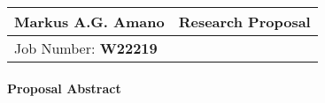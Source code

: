 \documentclass[12pt]{article}
\begin{document}
\begin{center}
  \begin{tabularx}{\textwidth} { 
      >{\raggedright\arraybackslash}X 
    >{\raggedleft\arraybackslash}X  }
    \huge Markus A.G. Amano & Research Proposal\\
    \hline
    Job Number: \textbf{W22219} & \\
  \end{tabularx}
\end{center}



\paragraph{Proposal Abstract}
\end{document}

